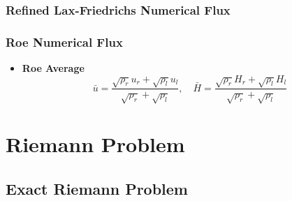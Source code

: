 \documentclass[11pt]{diazessay} %
\begin{document}
\subsubsection{Refined Lax-Friedrichs Numerical Flux}
\subsubsection{Roe Numerical Flux}


\cite{roe_approximate_1981}

\begin{itemize}
    \item \textbf{Roe Average}
    \begin{equation}
        \bar{u} = \frac{\sqrt{\rho_r}u_r + \sqrt{\rho_l}u_l}{\sqrt{\rho_r}+\sqrt{\rho_l}}, \quad \bar{H} =\frac{\sqrt{\rho_r}H_r + \sqrt{\rho_l}H_l}{\sqrt{\rho_r}+\sqrt{\rho_l}}
    \end{equation}
\end{itemize}




\section{Riemann Problem}
\subsection{Exact Riemann Problem}
\end{document}
